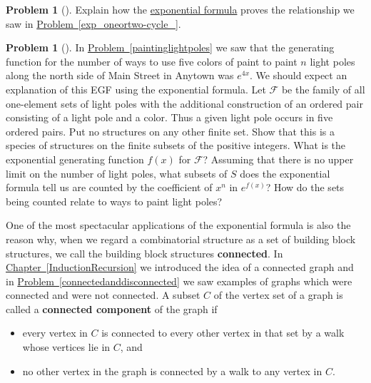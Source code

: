 \documentclass[10pt,]{book}
\newcommand{\terminology}[1]{\textbf{#1}}
\theoremstyle{plain}
\theoremstyle{definition}
\newtheorem{activity}[project]{Problem}
\theoremstyle{definition}
\numberwithin{equation}{chapter}
\newcommand{\F}{\mathcal{F}}
\begin{document}
\begin{activity}[] \label{activity-416}
Explain how the \hyperref[exponentialformulathm]{exponential formula} proves the relationship we saw in \hyperref[exp_oneortwo-cycle_]{Problem~\ref{exp_oneortwo-cycle_}}.%
\end{activity}
\begin{activity}[] \label{activity-417}
In \hyperref[paintinglightpoles]{Problem~\ref{paintinglightpoles}} we saw that the generating function for the number of ways to use five colors of paint to paint \(n\) light poles along the north side of Main Street in Anytown was \(e^{4x}\). We should expect an explanation of this EGF using the exponential formula. Let \(\F\) be the family of all one-element sets of light poles with the additional construction of an ordered pair consisting of a light pole and a color. Thus a given light pole occurs in five ordered pairs. Put no structures on any other finite set. Show that this is a species of structures on the finite subsets of the positive integers. What is the exponential generating function \(f(x)\) for \(\F\)? Assuming that there is no upper limit on the number of light poles, what subsets of \(S\) does the exponential formula tell us are counted by the coefficient of \(x^n\) in \(e^{f(x)}\)? How do the sets being counted relate to ways to paint light poles?%
\end{activity}
One of the most spectacular applications of the exponential formula is also the reason why, when we regard a combinatorial structure as a set of building block structures, we call the building block structures \terminology{connected}. In \hyperref[InductionRecursion]{Chapter~\ref{InductionRecursion}} we introduced the idea of a connected graph and in \hyperref[connectedanddisconnected]{Problem~\ref{connectedanddisconnected}} we saw examples of graphs which were connected and were not connected. A subset \(C\) of the vertex set of a graph is called a \terminology{connected component} of the graph if \leavevmode%
\begin{itemize}[label=\textbullet]
\item{}every vertex in \(C\) is connected to every other vertex in that set by a walk whose vertices lie in \(C\), and%
\item{}no other vertex in the graph is connected by a walk to any vertex in \(C\).%
\end{itemize}
\end{document}
